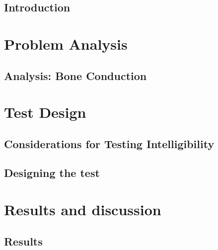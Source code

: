 \glsresetall
 \graphicspath{{figures/analysing/}}
\chapter{Introduction}\label{ch:intro}



\part{Problem Analysis}\label{pt:analysis} \glsresetall
\graphicspath{{figures/analysis/}}
\chapter{Analysis: Bone Conduction}\label{ch:bone_conductors}







\part{Test Design}\label{pt:design} 
\graphicspath{{figures/design/}}	
\chapter{Considerations for Testing Intelligibility}\label{ch:test_considerations}





\chapter{Designing the test}\label{ch:test_design}





\part{Results and discussion}\label{pt:test}
\chapter{Results}
\graphicspath{{figures/tests/}}



